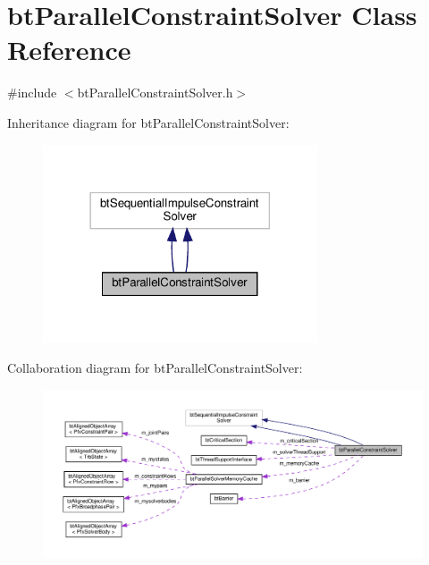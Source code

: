 \hypertarget{classbtParallelConstraintSolver}{}\section{bt\+Parallel\+Constraint\+Solver Class Reference}
\label{classbtParallelConstraintSolver}


{\ttfamily \#include $<$bt\+Parallel\+Constraint\+Solver.\+h$>$}



Inheritance diagram for bt\+Parallel\+Constraint\+Solver\+:
\nopagebreak
\begin{figure}[H]
\begin{center}
\leavevmode
\includegraphics[width=230pt]{classbtParallelConstraintSolver__inherit__graph}
\end{center}
\end{figure}


Collaboration diagram for bt\+Parallel\+Constraint\+Solver\+:
\nopagebreak
\begin{figure}[H]
\begin{center}
\leavevmode
\includegraphics[width=350pt]{classbtParallelConstraintSolver__coll__graph}
\end{center}
\end{figure}
